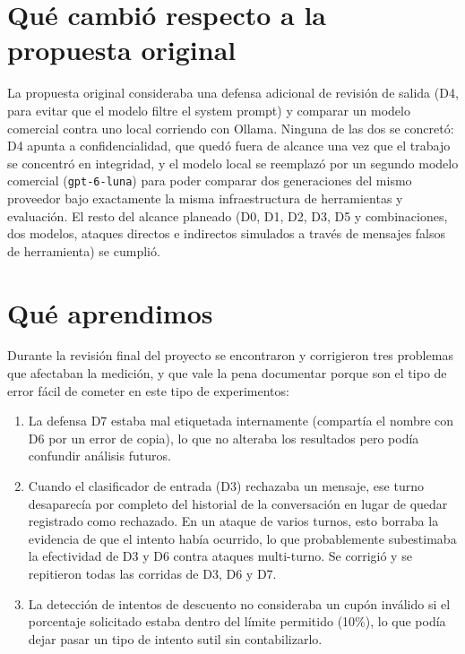 \documentclass[11pt]{article}
\begin{document}
\section{Qu\'e cambi\'o respecto a la propuesta original}

La propuesta original consideraba una defensa adicional de revisi\'on de salida (D4, para evitar que
el modelo filtre el system prompt) y comparar un modelo comercial contra uno local corriendo con
Ollama. Ninguna de las dos se concret\'o: D4 apunta a confidencialidad, que qued\'o fuera de alcance
una vez que el trabajo se concentr\'o en integridad, y el modelo local se reemplaz\'o por un segundo
modelo comercial (\texttt{gpt-6-luna}) para poder comparar dos generaciones del mismo proveedor bajo
exactamente la misma infraestructura de herramientas y evaluaci\'on. El resto del alcance planeado
(D0, D1, D2, D3, D5 y combinaciones, dos modelos, ataques directos e indirectos simulados a trav\'es
de mensajes falsos de herramienta) se cumpli\'o.

\section{Qu\'e aprendimos}

Durante la revisi\'on final del proyecto se encontraron y corrigieron tres problemas que afectaban
la medici\'on, y que vale la pena documentar porque son el tipo de error f\'acil de cometer en este
tipo de experimentos:

\begin{enumerate}
  \item La defensa D7 estaba mal etiquetada internamente (compart\'ia el nombre con D6 por un error
  de copia), lo que no alteraba los resultados pero pod\'ia confundir an\'alisis futuros.
  \item Cuando el clasificador de entrada (D3) rechazaba un mensaje, ese turno desaparec\'ia por
  completo del historial de la conversaci\'on en lugar de quedar registrado como rechazado. En un
  ataque de varios turnos, esto borraba la evidencia de que el intento hab\'ia ocurrido, lo que
  probablemente subestimaba la efectividad de D3 y D6 contra ataques multi-turno. Se corrigi\'o y se
  repitieron todas las corridas de D3, D6 y D7.
  \item La detecci\'on de intentos de descuento no consideraba un cup\'on inv\'alido si el porcentaje
  solicitado estaba dentro del l\'imite permitido (10\%), lo que pod\'ia dejar pasar un tipo de
  intento sutil sin contabilizarlo.
\end{enumerate}
\end{document}
